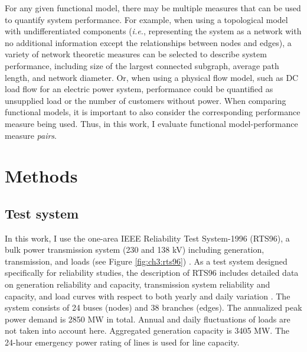 For any given functional model, there may be multiple measures that can be used to quantify system performance.  For example, when using a topological model with undifferentiated components (\emph{i.e.}, representing the system as a network with no additional information except the relationships between nodes and edges), a variety of network theoretic measures can be selected to describe system performance, including size of the largest connected subgraph, average path length,  and network diameter.  Or, when using a physical flow model, such as DC load flow for an electric power system, performance could be quantified as unsupplied load or the number of customers without power.  When comparing functional models, it is important to also consider the corresponding performance measure being used.  Thus, in this work, I evaluate functional model-performance measure \emph{pairs}.


\section{Methods}
\label{sec:ch3:methods}

\subsection{Test system}
\label{sec:ch3:methods:testsys}

In this work, I use the one-area IEEE Reliability Test System-1996 (RTS96), a bulk power transmission system (230 and 138 kV) including generation, transmission, and loads (see Figure \ref{fig:ch3:rts96}) \cite{Grigg1999}. As a test system designed specifically for reliability studies, the description of RTS96 includes detailed data on generation reliability and capacity, transmission system reliability and capacity, and load curves with respect to both yearly and daily variation \cite{Grigg1999}. The system consists of 24 buses (nodes) and 38 branches (edges). The annualized peak power demand is 2850 MW in total. Annual and daily fluctuations of loads are not taken into account here. Aggregated generation capacity is 3405 MW. The 24-hour emergency power rating of lines is used for line capacity.


